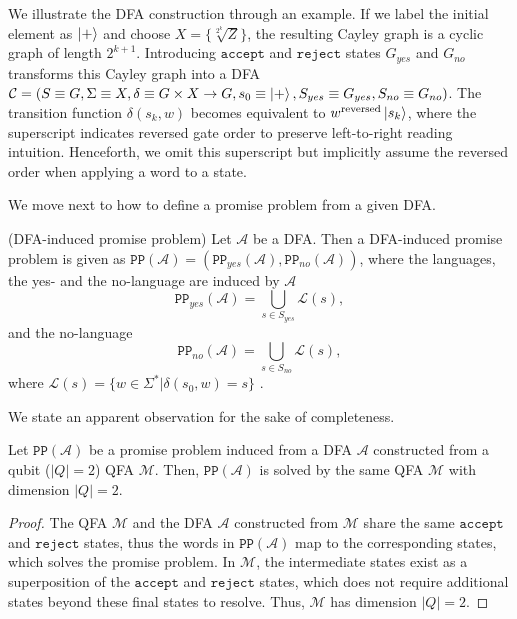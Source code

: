 \documentclass[../main.tex]{subfiles}
\begin{document}
We illustrate the \ac{DFA} construction through an example. If we label the initial element as $\ket{+}$ and choose $X = \{ \sqrt[2^k]{Z} \}$, the resulting Cayley graph is a cyclic graph of length $2^{k+1}$. Introducing $\mathtt{accept}$ and $\mathtt{reject}$  states $G_{yes}$ and $G_{no}$ transforms this Cayley graph into a DFA $\mathcal{C} = (S \equiv G, \Sigma \equiv X, \delta \equiv G \times X \rightarrow G, s_0 \equiv \ket{+}, S_{yes} \equiv G_{yes}, S_{no} \equiv G_{no})$. The transition function $\delta(s_k,w)$ becomes equivalent to $w^{\text{reversed}}\ket{s_k}$, where the superscript indicates reversed gate order to preserve left-to-right reading intuition. Henceforth, we omit this superscript but implicitly assume the reversed order when applying a word to a state.

We move next to how to define a promise problem from a given DFA.

\begin{definition}\label{def:dfainducedpp} (DFA-induced promise problem) Let $\mathcal{A}$ be a DFA. Then a DFA-induced promise problem is given as $\mathtt{PP}(\mathcal{A}) = (\mathtt{PP}_{yes}(\mathcal{A}), \mathtt{PP}_{no}(\mathcal{A}))$, where the languages, the yes- and the no-language are induced by $\mathcal{A}$
    \begin{equation}
        \mathtt{PP}_{yes}(\mathcal{A}) = \bigcup_{s \in S_{yes}} \mathcal{L}(s) ,
    \end{equation}
    and the no-language
    \begin{equation}
         \mathtt{PP}_{no}(\mathcal{A}) = \bigcup_{s \in S_{no}} \mathcal{L}(s) ,
    \end{equation}
    where $\mathcal{L}(s) = \{ w \in \Sigma^* | \delta(s_0,w) = s \}$ .
\end{definition}

We state an apparent observation for the sake of completeness.

\begin{theorem}
    Let $\mathtt{PP}(\mathcal{A})$ be a promise problem induced from a DFA $\mathcal{A}$ constructed from a qubit ($|Q| = 2$) QFA $\mathcal{M}$.  Then, $\mathtt{PP}(\mathcal{A})$ is solved by the same QFA $\mathcal{M}$ with dimension $|Q| = 2$.
\end{theorem}

\begin{proof}
     The QFA $\mathcal{M}$ and the DFA $\mathcal{A}$ constructed from $\mathcal{M}$ share the same $\mathtt{accept}$ and $\mathtt{reject}$  states, thus the words in $\mathtt{PP}(\mathcal{A})$ map to the corresponding states, which solves the promise problem. In $\mathcal{M}$, the intermediate states exist as a superposition of the $\mathtt{accept}$ and $\mathtt{reject}$  states, which does not require additional states beyond these final states to resolve. Thus, $\mathcal{M}$ has dimension $|Q| = 2$.
\end{proof}
\end{document}

